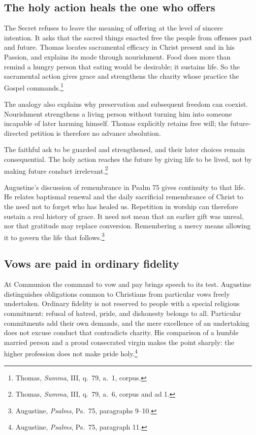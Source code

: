 \subsection{The holy action heals the one who offers}
The Secret refuses to leave the meaning of offering at the level of sincere intention. It asks that the sacred things enacted free the people from offenses past and future. Thomas locates sacramental efficacy in Christ present and in his Passion, and explains its mode through nourishment. Food does more than remind a hungry person that eating would be desirable; it sustains life. So the sacramental action gives grace and strengthens the charity whose practice the Gospel commands.\footnote{Thomas, \textit{Summa}, III, q.~79, a.~1, corpus.}

The analogy also explains why preservation and subsequent freedom can coexist. Nourishment strengthens a living person without turning him into someone incapable of later harming himself. Thomas explicitly retains free will; the future-directed petition is therefore no advance absolution.

The faithful ask to be guarded and strengthened, and their later choices remain consequential. The holy action reaches the future by giving life to be lived, not by making future conduct irrelevant.\footnote{Thomas, \textit{Summa}, III, q.~79, a.~6, corpus and ad 1.}

Augustine's discussion of remembrance in Psalm 75 gives continuity to that life. He relates baptismal renewal and the daily sacrificial remembrance of Christ to the need not to forget who has healed us. Repetition in worship can therefore sustain a real history of grace. It need not mean that an earlier gift was unreal, nor that gratitude may replace conversion. Remembering a mercy means allowing it to govern the life that follows.\footnote{Augustine, \textit{Psalms}, Ps.~75, paragraphs 9--10.}

\subsection{Vows are paid in ordinary fidelity}
At Communion the command to vow and pay brings speech to its test. Augustine distinguishes obligations common to Christians from particular vows freely undertaken. Ordinary fidelity is not reserved to people with a special religious commitment: refusal of hatred, pride, and dishonesty belongs to all. Particular commitments add their own demands, and the mere excellence of an undertaking does not excuse conduct that contradicts charity. His comparison of a humble married person and a proud consecrated virgin makes the point sharply: the higher profession does not make pride holy.\footnote{Augustine, \textit{Psalms}, Ps.~75, paragraph 11.}

